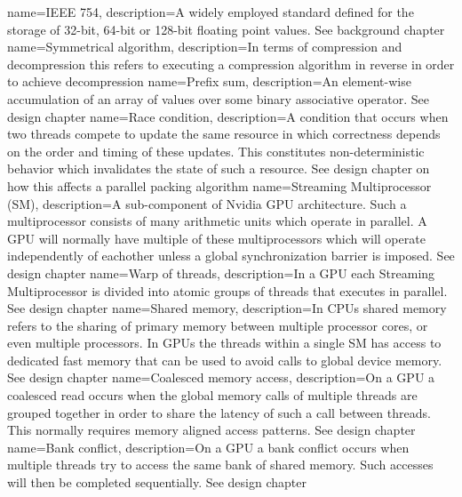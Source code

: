  {
  name={IEEE 754},
  description={A widely employed standard defined for the storage of 32-bit, 64-bit or 128-bit floating point values. See background chapter}
 } 
 {
  name={Symmetrical algorithm},
  description={In terms of compression and decompression this refers to executing a compression algorithm in reverse in order to achieve decompression}
 }
 {
  name={Prefix sum},
  description={An element-wise accumulation of an array of values over some binary associative operator. See design chapter}
 }
 {
  name={Race condition},
  description={A condition that occurs when two threads compete to update the same resource in which correctness depends on the order and timing of these updates. This 
  constitutes non-deterministic behavior which invalidates the state of such a resource. See design chapter on how this affects a parallel packing algorithm}
 }
 {
  name={Streaming Multiprocessor (SM)},
  description={A sub-component of Nvidia GPU architecture. Such a multiprocessor consists of many arithmetic units which operate in parallel. A GPU will normally have
  multiple of these multiprocessors which will operate independently of eachother unless a global synchronization barrier is imposed. See design chapter}
 }
 {
  name={Warp of threads},
  description={In a GPU each Streaming Multiprocessor is divided into atomic groups of threads that executes in parallel. See design chapter}
 }
 {
  name={Shared memory},
  description={In CPUs shared memory refers to the sharing of primary memory between multiple processor cores, or even multiple processors. In GPUs the threads within
  a single SM has access to dedicated fast memory that can be used to avoid calls to global device memory. See design chapter}
 }
 {
  name={Coalesced memory access},
  description={On a GPU a coalesced read occurs when the global memory calls of multiple threads are grouped together in order to share the latency of such a call
  between threads. This normally requires memory aligned access patterns. See design chapter}
 }
 {
  name={Bank conflict},
  description={On a GPU a bank conflict occurs when multiple threads try to access the same bank of shared memory. Such accesses will then be completed sequentially.
  See design chapter}
 }
